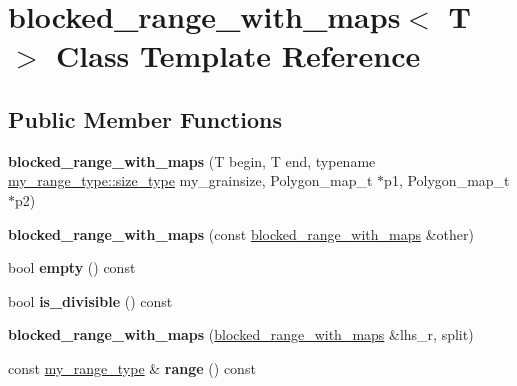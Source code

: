 \hypertarget{classblocked__range__with__maps}{}\section{blocked\+\_\+range\+\_\+with\+\_\+maps$<$ T $>$ Class Template Reference}
\label{classblocked__range__with__maps}
\subsection*{Public Member Functions}
\begin{DoxyCompactItemize}
\item 
\hypertarget{classblocked__range__with__maps_ade1f2350373a3acd73967347a1bd2f85}{}{\bfseries blocked\+\_\+range\+\_\+with\+\_\+maps} (T begin, T end, typename \hyperlink{classtbb_1_1blocked__range_a89b300cecd9d617e4ee801c786756e55}{my\+\_\+range\+\_\+type\+::size\+\_\+type} my\+\_\+grainsize, Polygon\+\_\+map\+\_\+t $\ast$p1, Polygon\+\_\+map\+\_\+t $\ast$p2)\label{classblocked__range__with__maps_ade1f2350373a3acd73967347a1bd2f85}

\item 
\hypertarget{classblocked__range__with__maps_a7a88eeca102757bcf80749c5e9d49af0}{}{\bfseries blocked\+\_\+range\+\_\+with\+\_\+maps} (const \hyperlink{classblocked__range__with__maps}{blocked\+\_\+range\+\_\+with\+\_\+maps} \&other)\label{classblocked__range__with__maps_a7a88eeca102757bcf80749c5e9d49af0}

\item 
\hypertarget{classblocked__range__with__maps_afa4670947df0d35a49853ccda307a1d4}{}bool {\bfseries empty} () const \label{classblocked__range__with__maps_afa4670947df0d35a49853ccda307a1d4}

\item 
\hypertarget{classblocked__range__with__maps_ade4ba92e2d4d55215bcf39134276e0d1}{}bool {\bfseries is\+\_\+divisible} () const \label{classblocked__range__with__maps_ade4ba92e2d4d55215bcf39134276e0d1}

\item 
\hypertarget{classblocked__range__with__maps_a0625640b6ccecd8719ee8f636f894c05}{}{\bfseries blocked\+\_\+range\+\_\+with\+\_\+maps} (\hyperlink{classblocked__range__with__maps}{blocked\+\_\+range\+\_\+with\+\_\+maps} \&lhs\+\_\+r, split)\label{classblocked__range__with__maps_a0625640b6ccecd8719ee8f636f894c05}

\item 
\hypertarget{classblocked__range__with__maps_a126d8213dfd5a40a7acf7a1f693cf0c9}{}const \hyperlink{classtbb_1_1blocked__range}{my\+\_\+range\+\_\+type} \& {\bfseries range} () const \label{classblocked__range__with__maps_a126d8213dfd5a40a7acf7a1f693cf0c9}


\end{DoxyCompactItemize}
